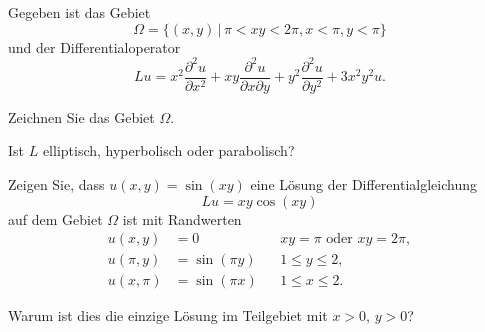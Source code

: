 Gegeben ist das Gebiet
\[
\Omega=\{
(x,y)\,|\,\pi < xy < 2\pi, x < \pi,y < \pi
\}
\]
und der Differentialoperator
\[
Lu=
x^2\frac{\partial^2u}{\partial x^2}
+xy\frac{\partial^2u}{\partial x\partial y}
+y^2\frac{\partial^2u}{\partial y^2}
+3x^2y^2u.
\]
\begin{teilaufgaben}
\item Zeichnen Sie das Gebiet $\Omega$.
\item Ist $L$ elliptisch, hyperbolisch oder parabolisch?
\item Zeigen Sie, dass $u(x,y)=\sin(xy)$ eine Lösung der
Differentialgleichung
\[
Lu=xy\cos(xy)
\]
auf dem Gebiet $\Omega$ ist mit Randwerten
\begin{align*}
u(x,y)&=0            &&\text{$xy=\pi$ oder $xy=2\pi$},\\
u(\pi,y)&=\sin(\pi y)&&1\le y\le 2,\\
u(x,\pi)&=\sin(\pi x)&&1\le x\le 2.
\end{align*}
\item Warum ist dies die einzige Lösung im Teilgebiet mit $x>0$, $y>0$?
\end{teilaufgaben}

